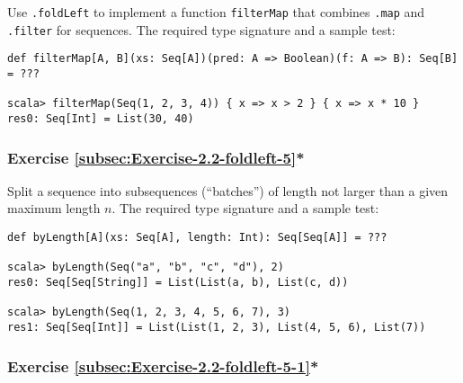Use \lstinline!.foldLeft! to implement a function \lstinline!filterMap!
that combines \lstinline!.map! and \lstinline!.filter! for sequences.
The required type signature and a sample test:
\begin{lstlisting}
def filterMap[A, B](xs: Seq[A])(pred: A => Boolean)(f: A => B): Seq[B] = ???

scala> filterMap(Seq(1, 2, 3, 4)) { x => x > 2 } { x => x * 10 }
res0: Seq[Int] = List(30, 40)
\end{lstlisting}


\subsubsection{Exercise \label{subsec:Exercise-2.2-foldleft-5}\ref{subsec:Exercise-2.2-foldleft-5}{*}}

Split a sequence into subsequences (``batches'') of length not larger
than a given maximum length $n$. The required type signature and
a sample test:
\begin{lstlisting}
def byLength[A](xs: Seq[A], length: Int): Seq[Seq[A]] = ???

scala> byLength(Seq("a", "b", "c", "d"), 2)
res0: Seq[Seq[String]] = List(List(a, b), List(c, d))

scala> byLength(Seq(1, 2, 3, 4, 5, 6, 7), 3)
res1: Seq[Seq[Int]] = List(List(1, 2, 3), List(4, 5, 6), List(7))
\end{lstlisting}
\begin{comment}
Solution:
\begin{lstlisting}
def batching[A](xs: Seq[A], size: Int): Seq[Seq[A]] = {  
  type Acc = (Seq[Seq[A]], Seq[A], Int)
  val init: Acc = ((Seq(), Seq(), 0))
  val (result, rem, _) = xs.foldLeft(init){ case ((seq, rem, len), x) =>
    val newLen = len + 1
    if (newLen > size) (seq ++ Seq(rem), Seq(x), 1)
    else (seq, rem ++ Seq(x), newLen)
  }
  result ++ Seq(rem)
}
\end{lstlisting}
\end{comment}


\subsubsection{Exercise \label{subsec:Exercise-2.2-foldleft-5-1}\ref{subsec:Exercise-2.2-foldleft-5-1}{*}}

